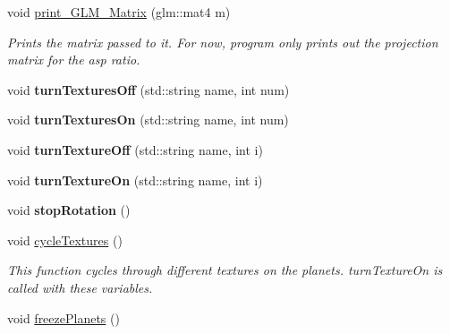 \begin{DoxyCompactItemize}
\mbox{\label{class_graphics_engine_a06253e3976fa7b6436f58ec3f472de15}} 
void \hyperlink{class_graphics_engine_a06253e3976fa7b6436f58ec3f472de15}{print\+\_\+\+G\+L\+M\+\_\+\+Matrix} (glm\+::mat4 m)
\begin{DoxyCompactList}\small\item\em Prints the matrix passed to it. For now, program only prints out the projection matrix for the asp ratio. \end{DoxyCompactList}\item 
\mbox{\label{class_graphics_engine_a13a43684e7a53ff0c39b7ef014a8d121}} 
void {\bfseries turn\+Textures\+Off} (std\+::string name, int num)
\item 
\mbox{\label{class_graphics_engine_a93d13fafc47d86e42a2d62b874af152d}} 
void {\bfseries turn\+Textures\+On} (std\+::string name, int num)
\item 
\mbox{\label{class_graphics_engine_a26a9223f0a99980ca872a3dc0ab940e4}} 
void {\bfseries turn\+Texture\+Off} (std\+::string name, int i)
\item 
\mbox{\label{class_graphics_engine_a87f26e8a7fb01b6e317ced365cda1e80}} 
void {\bfseries turn\+Texture\+On} (std\+::string name, int i)
\item 
\mbox{\label{class_graphics_engine_a4cc56f747711a78908a66eed17ac186b}} 
void {\bfseries stop\+Rotation} ()
\item 
\mbox{\label{class_graphics_engine_acbb4b9f37d9104699c1e6178945b5150}} 
void \hyperlink{class_graphics_engine_acbb4b9f37d9104699c1e6178945b5150}{cycle\+Textures} ()
\begin{DoxyCompactList}\small\item\em This function cycles through different textures on the planets. turn\+Texture\+On is called with these variables. \end{DoxyCompactList}\item 
\mbox{\label{class_graphics_engine_a5eb7749f275f0351cef181eafd217d6f}} 
void \hyperlink{class_graphics_engine_a5eb7749f275f0351cef181eafd217d6f}{freeze\+Planets} ()

\end{DoxyCompactItemize}
